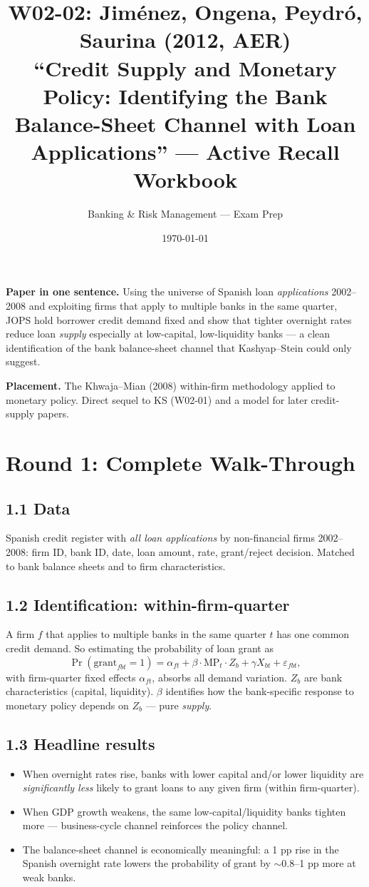 \documentclass[11pt]{article}
\title{W02-02: Jim\'enez, Ongena, Peydr\'o, Saurina (2012, AER) \\
\large ``Credit Supply and Monetary Policy: Identifying the Bank Balance-Sheet Channel with Loan Applications'' --- Active Recall Workbook}
\author{Banking \& Risk Management --- Exam Prep}
\date{\today}
\begin{document}
\maketitle

\begin{keybox}
\textbf{Paper in one sentence.} Using the universe of Spanish loan \emph{applications} 2002--2008 and exploiting firms that apply to multiple banks in the same quarter, JOPS hold borrower credit demand fixed and show that tighter overnight rates reduce loan \emph{supply} especially at low-capital, low-liquidity banks --- a clean identification of the bank balance-sheet channel that Kashyap--Stein could only suggest.

\textbf{Placement.} The Khwaja--Mian (2008) within-firm methodology applied to monetary policy. Direct sequel to KS (W02-01) and a model for later credit-supply papers.
\end{keybox}

\section*{Round 1: Complete Walk-Through}

\subsection*{1.1 Data}
Spanish credit register with \emph{all loan applications} by non-financial firms 2002--2008: firm ID, bank ID, date, loan amount, rate, grant/reject decision. Matched to bank balance sheets and to firm characteristics.

\subsection*{1.2 Identification: within-firm-quarter}
A firm $f$ that applies to multiple banks in the same quarter $t$ has one common credit demand. So estimating the probability of loan grant as
\[
\Pr(\text{grant}_{fbt}=1) = \alpha_{ft} + \beta\cdot \mathrm{MP}_t\cdot Z_b + \gamma X_{bt} + \varepsilon_{fbt},
\]
with firm-quarter fixed effects $\alpha_{ft}$, absorbs all demand variation. $Z_b$ are bank characteristics (capital, liquidity). $\beta$ identifies how the bank-specific response to monetary policy depends on $Z_b$ --- pure \emph{supply}.

\subsection*{1.3 Headline results}
\begin{itemize}
\item When overnight rates rise, banks with lower capital and/or lower liquidity are \emph{significantly less} likely to grant loans to any given firm (within firm-quarter).
\item When GDP growth weakens, the same low-capital/liquidity banks tighten more --- business-cycle channel reinforces the policy channel.
\item The balance-sheet channel is economically meaningful: a 1 pp rise in the Spanish overnight rate lowers the probability of grant by $\sim$0.8--1 pp more at weak banks.
\end{itemize}
\end{document}
